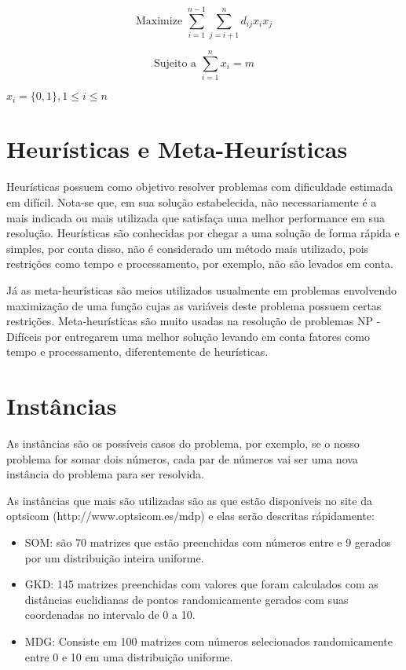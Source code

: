 \documentclass[12pt]{article}
\begin{document}
\begin{equation}
    \text{Maximize }\sum_{i=1}^{n-1} \sum_{j=i+1}^{n} d_{ij} x_{i} x_{j}
\end{equation}

\newpage
\begin{equation}
    \text{Sujeito a } \sum_{i=1}^{n} x_{i} = m
\end{equation}
\begin{center}
    $x_i=\{0,1\}, 1 \leq i \leq n$
\end{center}

\section{Heurísticas e Meta-Heurísticas}

Heurísticas possuem como objetivo resolver problemas com dificuldade estimada em difícil. Nota-se que, em sua solução estabelecida, não necessariamente é a mais indicada ou mais utilizada que satisfaça uma melhor performance em sua  resolução. Heurísticas são conhecidas por chegar a uma solução de forma rápida e simples, por conta disso,  não é considerado um método mais utilizado, pois restrições como tempo e processamento, por exemplo, não são levados em conta.

Já as meta-heurísticas são meios utilizados usualmente em problemas envolvendo maximização de uma função cujas as variáveis deste problema possuem certas restrições. Meta-heurísticas são muito usadas na resolução de problemas NP - Difíceis por entregarem uma melhor solução levando em conta fatores como tempo e processamento, diferentemente de heurísticas.

\section{Instâncias}

As instâncias são os possíveis casos do problema, por exemplo, se o nosso problema for somar dois números, cada par de números vai ser uma nova instância do problema para ser resolvida.

As instâncias que mais são utilizadas são as que estão disponiveis no site da optsicom (http://www.optsicom.es/mdp) e elas serão descritas rápidamente:

\begin{itemize}
    \item SOM: são 70 matrizes que estão preenchidas com números entre  e 9 gerados por um distribuição inteira uniforme.
    
    \item GKD: 145 matrizes preenchidas com valores que foram calculados com as distâncias euclidianas de pontos randomicamente gerados com suas coordenadas no intervalo de 0 a 10.
    
    \item MDG: Consiste em 100 matrizes com números selecionados randomicamente entre 0 e 10 em uma distribuição uniforme.
\end{itemize}
\end{document}
